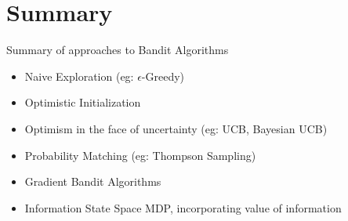 \section{Summary}
\begin{frame}{Summary of approaches to Bandit Algorithms}
\begin{itemize}
    \item Naive Exploration (eg: $\epsilon$-Greedy)
    \item Optimistic Initialization
    \item Optimism in the face of uncertainty (eg: UCB, Bayesian UCB)
    \item Probability Matching (eg: Thompson Sampling)
    \item Gradient Bandit Algorithms
    \item Information State Space MDP, incorporating value of information
\end{itemize}
\end{frame}
